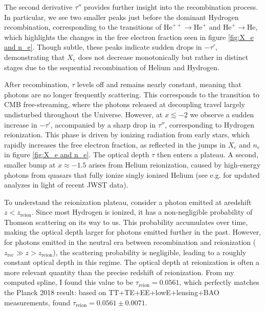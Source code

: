 \documentclass{aa}
\numberwithin{equation}{section}
\numberwithin{table}{section}
\numberwithin{figure}{section}
\begin{document}
The second derivative $\tau''$ provides further insight into the recombination process. In particular, we see two smaller peaks just before the dominant Hydrogen recombination, corresponding to the transitions of $\text{He}^{++} \rightarrow \text{He}^{+}$ and $\text{He}^{+} \rightarrow \text{He}$, which highlights the changes in the free electron fraction seen in figure \ref{fig:X_e and n_e}. Though subtle, these peaks indicate sudden drops in $-\tau'$, demonstrating that $X_e$ does not decrease monotonically but rather in distinct stages due to the sequential recombination of Helium and Hydrogen.

After recombination, $\tau$ levels off and remains nearly constant, meaning that photons are no longer frequently scattering. This corresponds to the transition to CMB free-streaming, where the photons released at decoupling travel largely undisturbed throughout the Universe. However, at $x \lesssim -2$ we observe a sudden increase in $-\tau'$, accompanied by a sharp drop in $\tau''$, corresponding to Hydrogen reionization. This phase is driven by ionizing radiation from early stars, which rapidly increases the free electron fraction, as reflected in the jumps in $X_e$ and $n_e$ in figure \ref{fig:X_e and n_e}. The optical depth $\tau$ then enters a plateau. A second, smaller bump at $x \approx -1.5$ arises from Helium reionization, caused by high-energy photons from quasars that fully ionize singly ionized Helium (see e.g. \cite{Helium} for updated analyzes in light of recent JWST data).

To understand the reionization plateau, consider a photon emitted at aredshift $z<z_\text{reion}$. Since most Hydrogen is ionized, it has a non-negligible probability of Thomson scattering on its way to us. This probability accumulates over time, making the optical depth larger for photons emitted further in the past. However, for photons emitted in the neutral era between recombination and reionization ($z_\text{rec} \gg z > z_\text{reion}$), the scattering probability is negligible, leading to a roughly constant optical depth in this regime. The optical depth at reionization is often a more relevant quantity than the precise redshift of reionization. From my computed spline, I found this value to be $\tau_\text{reion} = 0.0561$, which perfectly matches the Planck 2018 result: based on TT+TE+EE+lowE+lensing+BAO measurements, \cite{Planck} found $\tau_\text{reion} = 0.0561 \pm 0.0071$.
\end{document}
